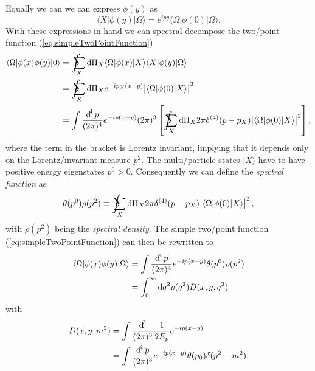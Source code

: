\documentclass[../../index.tex]{subfiles}
\begin{document}
Equally we can we can express $\phi(y)$ as
\begin{equation}
  \langle X \vert \phi(y) \vert \Omega \rangle = e^{ipy} \langle \Omega \vert \phi(0) \vert \Omega \rangle.
\end{equation}
With these expressions in hand we can spectral decompose the two\-/point
function (\cref{eq:simpleTwoPointFunction})
\begin{equation}
  \begin{split}
    \langle \Omega \vert \phi(x) \phi(y) \vert 0 \rangle
    &= \intsum_X \dif \Pi_X \langle \Omega \vert \phi(x) \vert X \rangle \langle X \vert \phi(y) \vert \Omega \rangle \\
    &= \intsum_X \dif \Pi_X e^{-i p_X (x-y)} \abs{\langle \Omega \vert \phi(0) \vert X \rangle}^2  \\
    &= \int \frac{\dif^4 p}{(2\pi)^4} e^{-i p (x-y)} (2\pi)^3 \left[ \intsum_X
      \dif \Pi_X 2\pi \delta^{(4)}(p-p_X) \abs{\langle \Omega \vert \phi(0)
        \vert X \rangle}^2 \right],
  \end{split}
\end{equation}
where the term in the bracket is Lorentz invariant, implying that it depends
only on the Lorentz\-/invariant measure $p^2$. The multi\-/particle states
$\vert X \rangle$ have to have positive energy eigenstates $p^0 > 0$.
Consequently we can define the \textit{spectral function} as
\begin{equation}
  \theta(p^0) \rho(p^2) \equiv \intsum_X \dif \Pi_X  2\pi \delta^{(4)}(p-p_X) \abs{\langle \Omega \vert \phi(0) \vert X \rangle}^2,
\end{equation}
with $\rho(p^2)$ being the \textit{spectral density}. The simple two\-/point
function (\cref{eq:simpleTwoPointFunction}) can then be rewritten to
\begin{equation}
  \begin{split}
    \langle \Omega \vert \phi(x) \phi(y) \vert \Omega \rangle &= \int \fdif{p} e^{-i p(x-y)} \theta(p^0) \rho(p^2) \\
    &= \int_0^\infty \dif q^2 \rho(q^2) D(x, y, q^2)
  \end{split}
\end{equation}
with
\begin{equation}
  \begin{split}
    D(x,y,m^2) &= \int \frac{\dif^3}{(2\pi)^3} \frac{1}{2E_p} e^{-i p (x-y)} \\
    &= \int \frac{\dif^4 p}{(2\pi)^3} e^{-i p (x-y)} \theta(p_0) \delta(p^2 -
    m^2).
  \end{split}
\end{equation}
\end{document}
